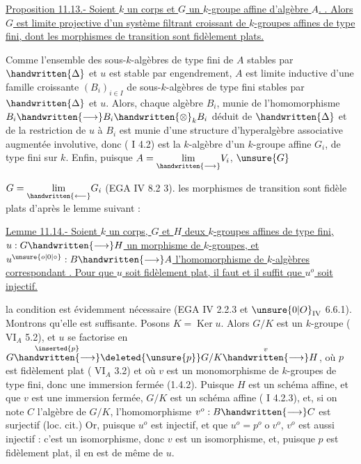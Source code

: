 \uline{Proposition 11.13.-  Soient $k$ un corps et $G$ un $k$-groupe affine d'algèbre $A$. . Alors $G$ est limite projective d'un système filtrant croissant de $k$-groupes affines de type fini, dont les morphismes de transition sont fidèlement plats.}

Comme l'ensemble des sous-$k$-algèbres de type fini de $A$ stables par $\handwritten{\Delta}$ et $u$ est stable par engendrement, $A$ est limite inductive d'une famille  croissante $(B_i)_{i\in I}$ de sous-$k$-algèbres de type fini stables par $\handwritten{\Delta}$ et $u$. Alors, chaque algèbre $B_i$, munie de l'homomorphisme $B_i\handwritten{\longrightarrow}B_i\handwritten{\otimes}_k B_i$ déduit de $\handwritten{\Delta}$ et de la restriction de $u$ à $B_i$ est munie d'une structure d'hyperalgèbre associative augmentée involutive, donc ( I 4.2) est la $k$-algèbre d'un $k$-groupe affine $G_i$, de type fini sur $k$. Enfin, puisque $A=\underset{\handwritten{\longrightarrow}}{\lim}V_i$,
$\unsure{G}$

$G=\underset{\handwritten{\longleftarrow}}{\lim}G_i$ (EGA IV 8.2 3).  les morphismes de transition sont fidèle plats d'après le lemme suivant :

\uline{Lemme 11.14.- Soient $k$ un corps, $G$ et $H$ deux $k$-groupes affines de type fini, $u:G\handwritten{\longrightarrow}H$ un morphisme de $k$-groupes, et $u^{\unsure{o|0|\circ}}:B\handwritten{\longrightarrow}A$ l'homomorphisme de $k$-algèbres correspondant . Pour que $u$ soit fidèlement plat, il faut et il suffit que $u^o$ soit injectif.}

la condition est évidemment nécessaire (EGA IV 2.2.3 et $\unsure{0|O}_{\mathrm{IV}}$ 6.6.1). Montrons qu'elle est suffisante. Posons $K=\operatorname{Ker}u$. Alors $G/K$ est un $k$-groupe ( $\mathrm{VI}_A$ 5.2), et $u$ se factorise en $G\overset{\inserted{p}}{\handwritten{\longrightarrow}}\deleted{\unsure{p}}G/K\overset{v}{\handwritten{\longrightarrow}}H$, où $p$ est fidèlement plat ( $\mathrm{VI}_A$ 3.2) et où $v$ est un monomorphisme de $k$-groupes de type fini, donc une immersion fermée (1.4.2). Puisque $H$ est un schéma affine, et que $v$ est une immersion fermée, $G/K$ est un schéma affine ( I 4.2.3), et, si on note $C$ l'algèbre de $G/K$, l'homomorphisme $v^o:B\handwritten{\longrightarrow}C$ est surjectif (loc. cit.) Or, puisque $u^o$ est injectif, et que $u^o=p^o\mathbin{o}v^o$, $v^o$ est aussi injectif : c'est un isomorphisme, donc $v$ est un isomorphisme, et, puisque $p$ est fidèlement plat, il en est de même de $u$.

